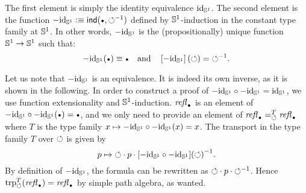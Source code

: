 \documentclass[english,a4]{article}
\renewcommand{\ap}[1]{\left[{#1}\right]}
\begin{document}
The first element is simply the identity equivalence $\mathord{\mathrm{id}}_{{\mathbb S^{1}}}$. The
second element is the function
$-\id_\Sc \defequi \ind(\base,\inv{\Sloop})$ defined by
${{\mathbb S^{1}}}$-induction in the constant type family at ${{\mathbb S^{1}}}$. In other words,
$-\mathord{\mathrm{id}}_{{\mathbb S^{1}}}$ is the (propositionally) unique function ${{\mathbb S^{1}}} \to {{\mathbb S^{1}}}$ such
that:
\begin{displaymath}
  -\id_\Sc(\base) \jdeq \base%
  \quad\text{and}\quad%
  \ap{-\id_\Sc}(\Sloop) = \inv{\Sloop}.
\end{displaymath}

Let us note that $-\mathord{\mathrm{id}}_{{\mathbb S^{1}}}$ is an equivalence. It is indeed its own inverse, as
it is shown in the following. In order to construct a proof of $-\mathord{\mathrm{id}}_{{\mathbb S^{1}}} \circ
-\mathord{\mathrm{id}}_{{\mathbb S^{1}}} = \mathord{\mathrm{id}}_{{\mathbb S^{1}}}$, we use function extensionality and ${{\mathbb S^{1}}}$-induction.
$\refl\base$ is an element of $-\id_\Sc\circ -\id_\Sc (\base) = \base$, and
we only need to provide an element of $\pathover {\refl\base} T \Sloop
{\refl\base}$ where $T$ is the type family $x \mapsto -\mathord{\mathrm{id}}_{{\mathbb S^{1}}} \circ -\mathord{\mathrm{id}}_{{\mathbb S^{1}}} (x)
= x$. The transport in the type family $T$ over $\mathord{\circlearrowleft}$ is given by
\begin{displaymath}
  p \mapsto \mathord{\circlearrowleft} \cdot p \cdot {[-\mathord{\mathrm{id}}_{{\mathbb S^{1}}}\circ -\mathord{\mathrm{id}}_{{\mathbb S^{1}}}](\mathord{\circlearrowleft})}^{-1}.
\end{displaymath}
By definition of $-\mathord{\mathrm{id}}_{{\mathbb S^{1}}}$, the formula can be rewritten as $\mathord{\circlearrowleft} \cdot p
\cdot {\mathord{\circlearrowleft}}^{-1}$.  Hence $\trp[T] \Sloop (\refl\base) = \refl\base$ by simple
path algebra, as wanted. 
\end{document}
